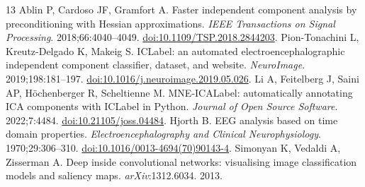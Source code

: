 \documentclass[11pt,a4paper]{article}
\begin{document}
\begin{thebibliography}{13}
 Ablin P, Cardoso JF, Gramfort A. Faster independent component analysis by preconditioning with Hessian approximations. \emph{IEEE Transactions on Signal Processing}. 2018;66:4040--4049. \href{https://doi.org/10.1109/TSP.2018.2844203}{doi:10.1109/TSP.2018.2844203}.
 Pion-Tonachini L, Kreutz-Delgado K, Makeig S. ICLabel: an automated electroencephalographic independent component classifier, dataset, and website. \emph{NeuroImage}. 2019;198:181--197. \href{https://doi.org/10.1016/j.neuroimage.2019.05.026}{doi:10.1016/j.neuroimage.2019.05.026}.
 Li A, Feitelberg J, Saini AP, Höchenberger R, Scheltienne M. MNE-ICALabel: automatically annotating ICA components with ICLabel in Python. \emph{Journal of Open Source Software}. 2022;7:4484. \href{https://doi.org/10.21105/joss.04484}{doi:10.21105/joss.04484}.
 Hjorth B. EEG analysis based on time domain properties. \emph{Electroencephalography and Clinical Neurophysiology}. 1970;29:306--310. \href{https://doi.org/10.1016/0013-4694(70)90143-4}{doi:10.1016/0013-4694(70)90143-4}.
 Simonyan K, Vedaldi A, Zisserman A. Deep inside convolutional networks: visualising image classification models and saliency maps. \emph{arXiv}:1312.6034. 2013.
\end{thebibliography}
\endgroup
\end{document}
